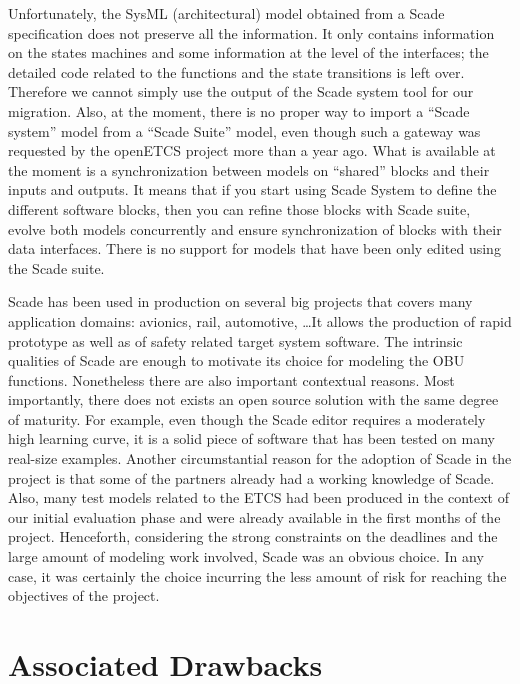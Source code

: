 \documentclass{template/openetcs_report}
\begin{document}
Unfortunately, the SysML (architectural) model obtained from a Scade
specification does not preserve all the information. It only contains
information on the states machines and some information at the level
of the interfaces; the detailed code related to the functions and the
state transitions is left over. Therefore we cannot simply use the
output of the Scade system tool for our migration. Also, at the
moment, there is no proper way to import a ``Scade system'' model from
a ``Scade Suite'' model, even though such a gateway was requested by
the openETCS project more than a year ago. What is available at the
moment is a synchronization between models on ``shared'' blocks and
their inputs and outputs. It means that if you start using Scade
System to define the different software blocks, then you can refine
those blocks with Scade suite, evolve both models concurrently and
ensure synchronization of blocks with their data interfaces. There is
no support for models that have been only edited using the Scade
suite.

Scade has been used in production on several big projects that covers
many application domains: avionics, rail, automotive, \dots It allows
the production of rapid prototype as well as of safety related target
system software. The intrinsic qualities of Scade are enough to
motivate its choice for modeling the OBU functions. Nonetheless there
are also important contextual reasons. Most importantly, there does
not exists an open source solution with the same degree of
maturity. For example, even though the Scade editor requires a
moderately high learning curve, it is a solid piece of software that
has been tested on many real-size examples. Another circumstantial
reason for the adoption of Scade in the project is that some of the
partners already had a working knowledge of Scade. Also, many test
models related to the ETCS had been produced in the context of our
initial evaluation phase and were already available in the first
months of the project. Henceforth, considering the strong constraints
on the deadlines and the large amount of modeling work involved, Scade
was an obvious choice. In any case, it was certainly the choice
incurring the less amount of risk for reaching the objectives of the
project.


\section{Associated Drawbacks}
\label{sec:associated-drawbacks}
\end{document}

